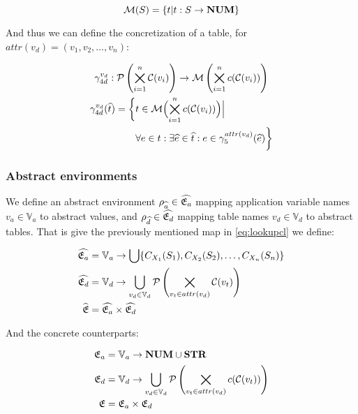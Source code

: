 \begin{equation}
    \mathcal{M}(S) = \{t | t : S \rightarrow \nums\}\label{eq:equation-nums}
\end{equation}


And thus we can define the concretization of a table, for $attr(v_d) = (v_1, v_2, \dots, v_n)$:


\begin{gather}
    \gamma^{v_d}_{4d} : \mathcal{P}\left(\bigtimes_{i = 1}^{n}\mathcal{C}(v_i)\right) \rightarrow \mathcal{M}\left(\bigtimes_{i = 1}^n c(\mathcal{C}(v_i))\right)\\
    \begin{split}
        \gamma^{v_d}_{4d}(\widehat{t}) = \biggl\{ &t \in \mathcal{M}\Bigl(\bigtimes_{i = 1}^n c(\mathcal{C}(v_i))\Bigr) \Big|\\
        &\forall e \in t : \exists \widehat{e} \in \widehat{t} : e \in \gamma^{attr(v_d)}_5(\widehat{e}) \biggr\}
    \end{split}
\end{gather}


\subsubsection{Abstract environments}
We define an abstract environment $\rho_{\widehat{a}} \in \widehat{\mathfrak{E}_a}$ mapping application variable names $v_a \in \mathbb{V}_a$ to abstract values, and $\rho_{\widehat{d}} \in \widehat{\mathfrak{E}_d}$ mapping table names $v_d \in \mathbb{V}_d$ to abstract tables.
That is give the previously mentioned map in \autoref{eq:lookupcl} we define:


\begin{align}
    \widehat{\mathfrak{E}_a} &= \mathbb{V}_a \rightarrow \bigcup \{ C_{X_1}(S_1), C_{X_2}(S_2), \dots, C_{X_n}(S_n) \} \\
    \widehat{\mathfrak{E}_d} &= \mathbb{V}_d \rightarrow \bigcup_{v_d \in \mathbb{V}_d} \mathcal{P}\left(\bigtimes_{v_t \in attr(v_d)}\mathcal{C}(v_t)\right) \\
    \widehat{\mathfrak{E}} &= \widehat{\mathfrak{E}_a} \times \widehat{\mathfrak{E}_d}
\end{align}


And the concrete counterparts:


\begin{align}
    \mathfrak{E}_a &= \mathbb{V}_a \rightarrow \mathbf{NUM} \cup \mathbf{STR} \\
    \mathfrak{E}_d &= \mathbb{V}_d \rightarrow \bigcup_{v_d \in \mathbb{V}_d} \mathcal{P}\left(\bigtimes_{v_t \in attr(v_d)}c(\mathcal{C}(v_t))\right) \\
    \mathfrak{E} &= \mathfrak{E}_a \times \mathfrak{E}_d
\end{align}


